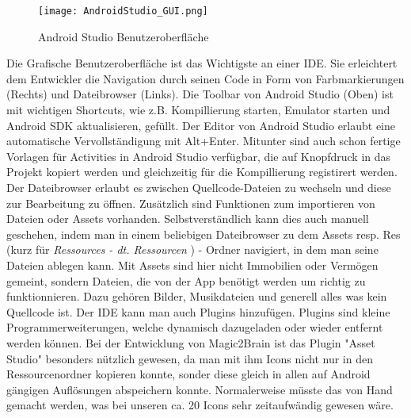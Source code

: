 \begin{figure}[htbp] 
  \centering
     \texttt{[image: AndroidStudio\_GUI.png]}
  \caption{Android Studio Benutzeroberfläche \cite{ASGUI}}
  \label{fig:Android Studio GUI}
\end{figure}
Die Grafische Benutzeroberfläche ist das Wichtigste an einer IDE. Sie erleichtert dem Entwickler die Navigation durch seinen Code in Form von Farbmarkierungen (Rechts) und Dateibrowser (Links).
Die Toolbar von Android Studio (Oben) ist mit wichtigen Shortcuts, wie z.B. Kompillierung starten, Emulator starten und Android SDK aktualisieren, gefüllt.
Der Editor von Android Studio erlaubt eine automatische Vervollständigung mit Alt+Enter. Mitunter sind auch schon fertige Vorlagen für Activities in Android Studio verfügbar, die auf Knopfdruck in das Projekt kopiert werden und gleichzeitig für die Kompillierung registirert werden. Der Dateibrowser erlaubt es zwischen Quellcode-Dateien zu wechseln und diese zur Bearbeitung zu öffnen. Zusätzlich sind Funktionen zum importieren von Dateien oder Assets vorhanden. Selbstverständlich kann dies auch manuell geschehen, indem man in einem beliebigen Dateibrowser zu dem Assets resp. Res (kurz für \textit{Ressources - dt. Ressourcen} ) - Ordner navigiert, in dem man seine Dateien ablegen kann. Mit Assets sind hier nicht Immobilien oder Vermögen gemeint, sondern Dateien, die von der App benötigt werden um richtig zu funktionnieren. Dazu gehören Bilder, Musikdateien und generell alles was kein Quellcode ist. Der IDE kann man auch Plugins hinzufügen. Plugins sind kleine Programmerweiterungen, welche dynamisch dazugeladen oder wieder entfernt werden können. Bei der Entwicklung von Magic2Brain ist das Plugin "Asset Studio" besonders nützlich gewesen, da man mit ihm Icons nicht nur in den Ressourcenordner kopieren konnte, sonder diese gleich in allen auf Android gängigen Auflösungen abspeichern konnte. Normalerweise müsste das von Hand gemacht werden, was bei unseren ca. 20 Icons sehr zeitaufwändig gewesen wäre.
